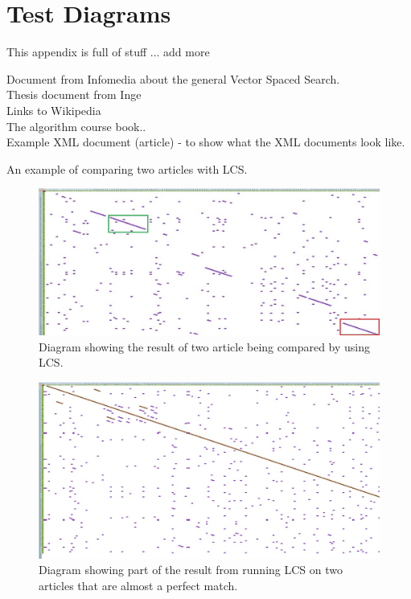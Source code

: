 \chapter{Test Diagrams}

This appendix is full of stuff ... add more

Document from Infomedia about the general Vector Spaced Search.\\
Thesis document from Inge\\
Links to Wikipedia\\
The algorithm course book..\\
Example XML document (article) - to show what the XML documents look like.

An example of comparing two articles with LCS.

\begin{figure}
	\includegraphics[scale=0.65]{figures/LcsExample}
	\caption{Diagram showing the result of two article being compared by using LCS.}
\end{figure}

\begin{figure}
	\includegraphics[scale=0.5]{figures/PerfectMatch}
	\caption{Diagram showing part of the result from running LCS on two articles that are almost a perfect match.}
\end{figure}

